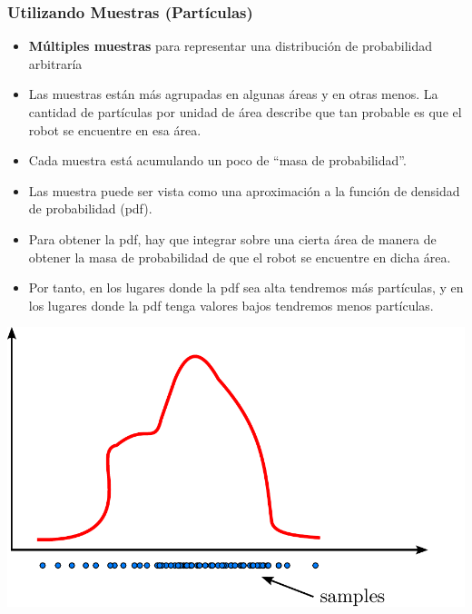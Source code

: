 \begin{frame}
    \frametitle{Utilizando Muestras (Partículas)}
    \footnotesize
    \begin{itemize}
        \item \textbf{Múltiples muestras} para representar una distribución de probabilidad arbitraría
        \item Las muestras están más agrupadas en algunas áreas y en otras menos. La cantidad de partículas por unidad de área describe que tan probable es que el robot se encuentre en esa área.
        \item Cada muestra está acumulando un poco de ``masa de probabilidad''.
        \item Las muestra puede ser vista como una aproximación a la función de densidad de probabilidad (pdf).
        \item Para obtener la pdf, hay que integrar sobre una cierta área de manera de obtener la masa de probabilidad de que el robot se encuentre en dicha área. 
        \item Por tanto, en los lugares donde la pdf sea alta tendremos más partículas, y en los lugares donde la pdf tenga valores bajos tendremos menos partículas.
    \end{itemize}
    
    \begin{center}
    \includegraphics[width=0.5\columnwidth]{./images/particle_filter/arbitrary_distribution_samples.pdf}
    \end{center}
    
\end{frame}

